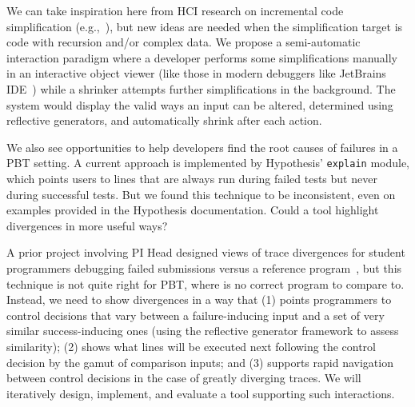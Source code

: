 {{We can take inspiration here from HCI research on incremental code simplification
(e.g.,~\cite{ref:lim2018ply,ref:head2018interactive,ref:holmes2012systematizing,ref:hibschman2016telescope}),
but new ideas are needed when the simplification target
is code with recursion and/or complex data. We propose a semi-automatic
interaction paradigm where a developer performs some simplifications
manually in an interactive
object viewer (like those in modern debuggers like JetBrains
IDE~\cite{tool:jetbrains}) while a shrinker attempts further
simplifications in the background. The system would
display
the valid ways an input can be altered,
determined using reflective generators,
and
automatically
shrink after each action.

We also see opportunities to help developers find the root causes of
failures in a PBT setting. A current approach is implemented by Hypothesis'
\texttt{explain} module, which points users to lines that are always run during
failed tests but never during successful tests. But we
found this technique to be inconsistent, even on examples provided in the
Hypothesis documentation.
Could a tool highlight divergences in more useful ways?

A prior project involving PI
Head designed views of trace divergences for student
programmers debugging failed submissions versus a reference
program~\cite{ref:suzuki2017tracediff}, but this technique is not
quite right for
PBT, where is no correct program to compare to.  Instead,
we need to show divergences in a way that (1) points programmers to control
decisions that vary between a failure-inducing input and a set of very similar
success-inducing ones (using the reflective generator framework to assess
similarity); (2) shows what lines will be executed next following the control
decision by the gamut of comparison inputs; and (3) supports rapid
navigation between
control decisions in the case of greatly diverging traces. We will iteratively
design, implement, and evaluate a tool supporting such interactions.

}



}
